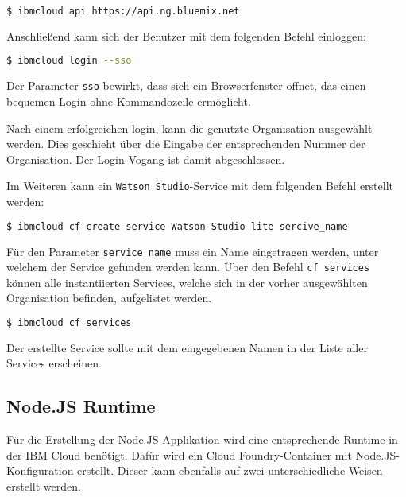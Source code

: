 \begin{lstlisting}[language=bash, caption=Setzen des API Targets, label=Setzen des API Targets]
    $ ibmcloud api https://api.ng.bluemix.net
\end{lstlisting}

Anschließend kann sich der Benutzer mit dem folgenden Befehl einloggen:

\begin{lstlisting}[language=bash, caption=Login über CLI und Single Sign-on, label=Login über CLI und SSO]
    $ ibmcloud login --sso
\end{lstlisting}

Der Parameter \texttt{sso} bewirkt, dass sich ein Browserfenster öffnet, das einen bequemen Login ohne Kommandozeile
ermöglicht.

Nach einem erfolgreichen login, kann die genutzte Organisation ausgewählt werden. Dies geschieht über die Eingabe der
entsprechenden Nummer der Organisation. Der Login-Vogang ist damit abgeschlossen.

Im Weiteren kann ein \texttt{Watson Studio}-Service mit dem folgenden Befehl erstellt werden:

\begin{lstlisting}[language=bash, caption=Instanziierung des Watson Studio Services, label=Instanziierung des Watson Studio Services]
    $ ibmcloud cf create-service Watson-Studio lite sercive_name
\end{lstlisting}

Für den Parameter \texttt{service\_name} muss ein Name eingetragen werden, unter welchem der Service gefunden werden kann.
Über den Befehl \texttt{cf services} können alle instantiierten Services, welche sich in der vorher ausgewählten
Organisation befinden, aufgelistet werden.

\begin{lstlisting}[language=bash, caption=Auflisten aller Services, label=Auflisten aller Services]
    $ ibmcloud cf services
\end{lstlisting}

Der erstellte Service sollte mit dem eingegebenen Namen in der Liste aller Services erscheinen.

\subsection{Node.JS Runtime}
\label{ssc:nodejs_runtime}
Für die Erstellung der Node.JS-Applikation wird eine entsprechende Runtime in der IBM Cloud benötigt. Dafür wird ein
Cloud Foundry-Container mit Node.JS-Konfiguration erstellt. Dieser kann ebenfalls auf zwei unterschiedliche Weisen erstellt
werden.

